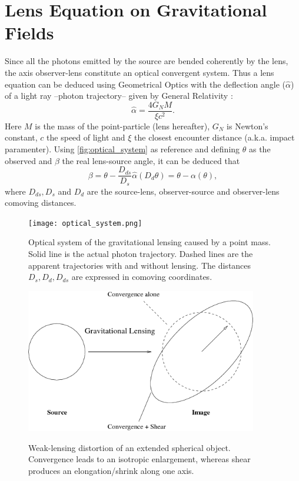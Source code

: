 \section{Lens Equation on Gravitational Fields}
Since all the photons emitted by the source are bended coherently by the lens, the axis observer-lens constitute an optical convergent system. Thus a lens equation can be deduced using Geometrical Optics with the deflection angle ($\hat\alpha$) of a light ray --photon trajectory-- given by General Relativity \cite{Weinberg,2001PhR...340..291B,2006glsw.conf.....M,2008ARNPS..58...99H,2041-8205-723-1-L13,Weinberg201387,2015RPPh...78h6901K}:
\begin{equation}
\hat\alpha = \frac{4G_NM}{\xi c^2}.
\label{eq:deflection_angle}
\end{equation}
Here $M$ is the mass of the point-particle (lens hereafter), $G_N$ is Newton's constant, $c$ the speed of light and $\xi$ the closest encounter distance (a.k.a. impact paramenter). Using \autoref{fig:optical_system} as reference and defining $\theta$ as the observed and $\beta$ the real lens-source angle, it can be deduced that
\begin{equation}
\beta = \theta - \frac{D_{ds}}{D_s}\hat\alpha(D_d\theta)=\theta-\alpha(\theta),
\label{eq:lens_equation}
\end{equation}
where $D_{ds},D_s$ and $D_d$ are the source-lens, observer-source and observer-lens comoving distances.
\begin{figure}
\begin{center}
\texttt{[image: optical\_system.png]}
\caption{Optical system of the gravitational lensing caused by a point mass. Solid line is the actual photon trajectory. Dashed lines are the apparent trajectories with and without lensing. The distances $D_s,D_d,D_{ds}$ are expressed in comoving coordinates. }
\label{fig:optical_system}
\vspace{1cm}
\includegraphics[width=0.9\textwidth]{./Pictures/distortion.png}
\caption{Weak-lensing distortion of an extended spherical object. Convergence leads to an isotropic enlargement, whereas shear produces an elongation/shrink along one axis.}
\label{fig:wl_distortion}
\end{center}
\end{figure}
\newline

